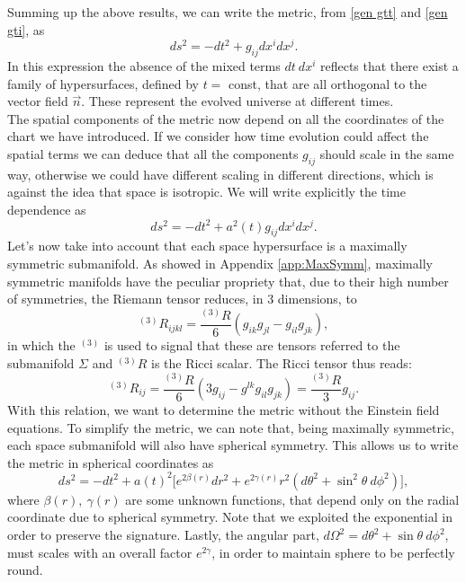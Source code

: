 Summing up the above results, we can write the metric, from \eqref{gen gtt} and \eqref{gen gti}, as
\begin{equation*}
    ds^2=-dt^2+g_{ij}dx^i dx^j.
\end{equation*}
In this expression the absence of the mixed terms $dt\ dx^i$ reflects that there exist a family of hypersurfaces, defined by $t=$ const, that are all orthogonal to the vector field $\vec n$. These represent the evolved universe at different times.\\
The spatial components of the metric now depend on all the coordinates of the chart we have introduced. If we consider how time evolution could affect the spatial terms we can deduce that all the components $g_{ij}$ should scale in the same way, otherwise we could have different scaling in different directions, which is against the idea that space is isotropic. We will write explicitly the time dependence as
\begin{equation*}
    ds^2=-dt^2+a^2(t)g_{ij}dx^i dx^j.
\end{equation*} 
Let's now take into account that each space hypersurface is a maximally symmetric submanifold. 
As showed in Appendix \ref{app:MaxSymm}, maximally symmetric manifolds have the peculiar propriety that, due to their high number of symmetries, the Riemann tensor reduces, in 3 dimensions, to 
\begin{equation*}
    ^{(3)}R_{ijkl}=\frac{^{(3)}R}{6}(g_{ik}g_{jl}-g_{il}g_{jk}),
\end{equation*}
in which the $^{(3)}$ is used to signal that these are tensors referred to the submanifold $\Sigma$ and $^{(3)}R$ is the Ricci scalar. The Ricci tensor thus reads:
\begin{equation}\label{maxsymRicci}
    ^{(3)}R_{ij}=\frac{^{(3)}R}{6}(3g_{ij}-g^{lk}g_{il}g_{jk})=\frac{^{(3)}R}{3}g_{ij}.
\end{equation}
With this relation, we want to determine the metric without the Einstein field equations.
To simplify the metric, we can note that, being maximally symmetric, each space submanifold will also have spherical symmetry. This allows us to write the metric in spherical coordinates as
\begin{equation*}
    ds^2=-dt^2+a(t)^2\big[e^{2\beta(r)}dr^2+e^{2\gamma(r)}r^2(d\theta^2+\sin^2\theta\ d\phi^2)\big],
\end{equation*}  
where $\beta(r),\ \gamma(r)$ are some unknown functions, that depend only on the radial coordinate due to spherical symmetry. Note that we exploited the exponential in order to preserve the signature. Lastly, the angular part, $d\Omega^2= d\theta^2+\sin\theta\ d\phi^2$, must scales with an overall factor $e^{2\gamma}$, in order to maintain sphere to be perfectly round.\\
